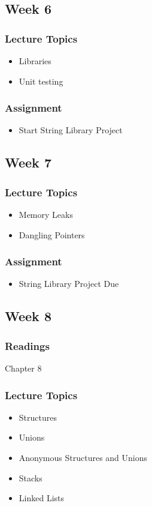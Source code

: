 \documentclass[a4paper,12pt]{report}
\begin{document}
\subsection*{Week 6}
\subsubsection*{Lecture Topics}
\begin{itemize}
\item Libraries
\item Unit testing 
\end{itemize}
\subsubsection*{Assignment}
\begin{itemize}
\item Start String Library Project 
\end{itemize}

\subsection*{Week 7}
\subsubsection*{Lecture Topics}
\begin{itemize}
\item Memory Leaks
\item Dangling Pointers 
\end{itemize}
\subsubsection*{Assignment}
\begin{itemize}
\item String Library Project Due
\end{itemize}

\subsection*{Week 8}
\subsubsection*{ Readings }
Chapter 8
\subsubsection*{Lecture Topics}
\begin{itemize}
\item Structures
\item Unions
\item Anonymous Structures and Unions
\item Stacks
\item Linked Lists
\end{itemize}
\end{document}
